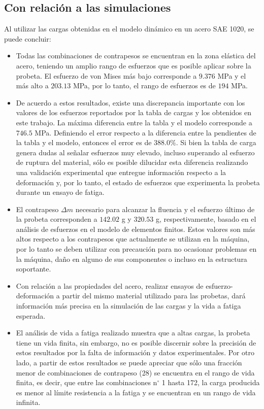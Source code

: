\subsection{Con relación a las simulaciones}
Al utilizar las cargas obtenidas en el modelo dinámico en un acero SAE 1020, se puede concluir:
\begin{itemize}
	\item Todas las combinaciones de contrapesos se encuentran en la zona elástica del acero, teniendo un amplio rango de esfuerzos que es posible aplicar sobre la probeta. El esfuerzo de von Mises más bajo corresponde a $9.376$ MPa y el más alto a $203.13$ MPa, por lo tanto, el rango de esfuerzos es de $194$ MPa. 
	\item De acuerdo a estos resultados, existe una discrepancia importante con los valores de los esfuerzos reportados por la tabla de cargas y los obtenidos en este trabajo. La máxima diferencia entre la tabla y el modelo corresponde a $746.5$ MPa. Definiendo el error respecto a la diferencia entre la pendientes de la tabla y el modelo, entonces el error es de $388.0 \%$. Si bien la tabla de carga genera dudas al señalar esfuerzos muy elevado, incluso superando al esfuerzo de ruptura del material, sólo es posible dilucidar esta diferencia realizando una validación experimental que entregue información respecto a la deformación y, por lo tanto, el estado de esfuerzos que experimenta la probeta durante un ensayo de fatiga. 
	\item El contrapeso $\Delta m$ necesario para alcanzar la fluencia y el esfuerzo último de la probeta corresponden a $142.02$ g y $320.53$ g, respectivamente, basado en el análisis de esfuerzos en el modelo de elementos finitos. Estos valores son más altos respecto a los contrapesos que actualmente se utilizan en la máquina, por lo tanto se deben utilizar con precaución para no ocasionar problemas en la máquina, daño en alguno de sus componentes o incluso en la estructura soportante.
	\item Con relación a las propiedades del acero, realizar ensayos de esfuerzo-deformación a partir del mismo material utilizado para las probetas, dará información más precisa en la simulación de las cargas y la vida a fatiga esperada.
	\item El análisis de vida a fatiga realizado muestra que a altas cargas, la probeta tiene un vida finita, sin embargo, no es posible discernir sobre la precisión de estos resultados por la falta de información y datos experimentales. Por otro lado, a partir de estos resultados se puede apreciar que sólo una fracción menor de combinaciones de contrapeso (28) se encuentra en el rango de vida finita, es decir, que entre las combinaciones n$^{\circ}$ 1 hasta 172, la carga producida es menor al límite resistencia a la fatiga y se encuentran en un rango de vida infinita.  

\end{itemize}
